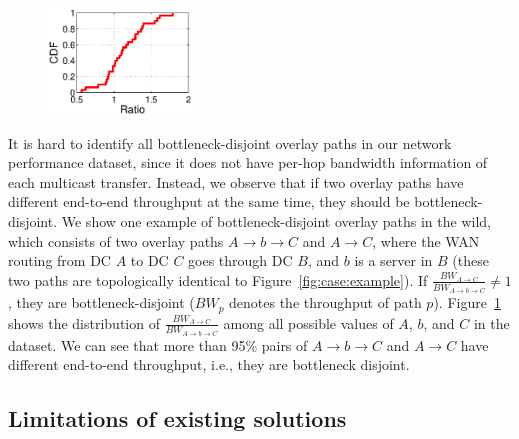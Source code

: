 \begin{figure}[t]
\centering
\includegraphics[width=1.5in]{images/potential_v2.eps}%
\label{fig:case:size}
\vspace{-0.4cm}
\end{figure}

It is hard to identify all bottleneck-disjoint overlay paths in our
network performance dataset, since it does not have per-hop bandwidth information of each
multicast transfer.
Instead, we observe that if two overlay paths have different end-to-end
throughput at the same time, they should be bottleneck-disjoint.
We show one example of bottleneck-disjoint overlay paths in the wild,
which consists of two overlay paths $A$$\rightarrow$$b$$\rightarrow$$C$
and $A$$\rightarrow$$C$, where the WAN routing from DC $A$ to DC $C$ goes
through DC $B$, and $b$ is a server in $B$ (these two paths are
topologically identical to Figure~\ref{fig:case:example}).
If $\frac{BW_{A\rightarrow C}}{BW_{A\rightarrow b\rightarrow C}}\neq1$,
they are bottleneck-disjoint ($BW_p$ denotes the throughput of path $p$).
Figure~\ref{fig:case:size} shows the distribution of
$\frac{BW_{A\rightarrow C}}{BW_{A\rightarrow b\rightarrow C}}$
among all possible values of $A$, $b$, and $C$ in the dataset.
We can see that more than 95\% pairs of $A$$\rightarrow$$b$$\rightarrow$$C$
and $A$$\rightarrow$$C$ have different end-to-end throughput, i.e.,
they are bottleneck disjoint.


\subsection{Limitations of existing solutions}
\label{subsec:motivation:baseline}

